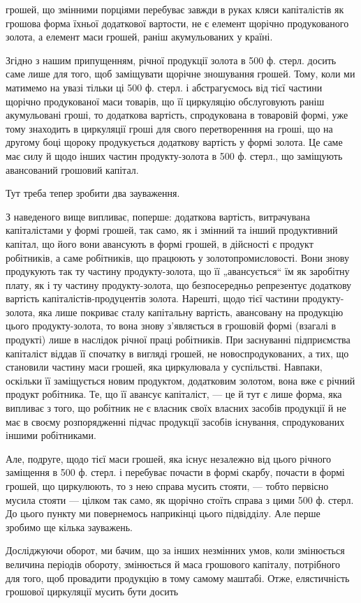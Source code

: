 \parcont{}  %
грошей, що змінними порціями перебуває завжди в руках кляси капіталістів
як грошова форма їхньої додаткової вартости, не є елемент
щорічно продукованого золота, а елемент маси грошей, раніш акумульованих
у країні.

Згідно з нашим припущенням, річної продукції золота в 500 ф. стерл.
досить саме лише для того, щоб заміщувати щорічне зношування грошей.
Тому, коли ми матимемо на увазі тільки ці 500 ф. стерл. і абстрагуємось
від тієї частини щорічно продукованої маси товарів, що її циркуляцію
обслуговують раніш акумульовані гроші, то додаткова вартість, спродукована
в товаровій формі, уже тому знаходить в циркуляції гроші для
свого перетворенння на гроші, що на другому боці щороку продукується
додаткову вартість у формі золота. Це саме має силу й щодо інших частин
продукту-золота в 500 ф. стерл., що заміщують авансований грошовий
капітал.

Тут треба тепер зробити два зауваження.

З наведеного вище випливає, поперше: додаткова вартість, витрачувана
капіталістами у формі грошей, так само, як і змінний та інший
продуктивний капітал, що його вони авансують в формі грошей, в
дійсності є продукт робітників, а саме робітників, що працюють у
золотопромисловості. Вони знову продукують так ту частину продукту-золота,
що її „авансується“ їм як заробітну плату, як і ту частину
продукту-золота, що безпосередньо репрезентує додаткову вартість
капіталістів-продуцентів золота. Нарешті, щодо тієї частини продукту-золота,
яка лише покриває сталу капітальну вартість, авансовану на
продукцію цього продукту-золота, то вона знову з’являється в грошовій
формі (взагалі в продукті) лише в наслідок річної праці робітників.
При заснуванні підприємства капіталіст віддав її спочатку в вигляді
грошей, не новоспродукованих, а тих, що становили частину маси грошей,
яка циркулювала у суспільстві. Навпаки, оскільки її заміщується новим
продуктом, додатковим золотом, вона вже є річний продукт робітника.
Те, що її авансує капіталіст, — це й тут є лише форма, яка випливає з
того, що робітник не є власник своїх власних засобів продукції й не
має в своєму розпорядженні підчас продукції засобів існування, спродукованих
іншими робітниками.

Але, подруге, щодо тієї маси грошей, яка існує незалежно від цього
річного заміщення в 500 ф. стерл. і перебуває почасти в формі скарбу,
почасти в формі грошей, що циркулюють, то з нею справа мусить
стояти, — тобто первісно мусила стояти — цілком так само, як щорічно
стоїть справа з цими 500 ф. стерл. До цього пункту ми повернемось
наприкінці цього підвідділу. Але перше зробимо ще кілька зауважень.

Досліджуючи оборот, ми бачим, що за інших незмінних умов, коли
змінюється величина періодів обороту, змінюється й маса грошового
капіталу, потрібного для того, щоб провадити продукцію в тому самому
маштабі. Отже, елястичність грошової циркуляції мусить бути досить
\parbreak{}  %
